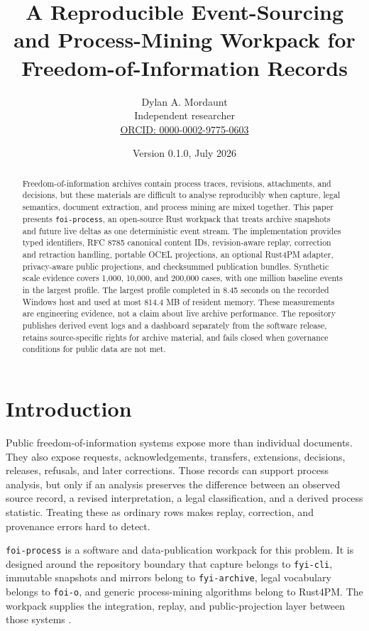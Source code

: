 \documentclass[11pt]{article}
\title{A Reproducible Event-Sourcing and Process-Mining Workpack for Freedom-of-Information Records}
\author{Dylan A. Mordaunt\\\small Independent researcher\\\small \href{https://orcid.org/0000-0002-9775-0603}{ORCID: 0000-0002-9775-0603}}
\date{Version 0.1.0, July 2026}
\begin{document}
\maketitle

\begin{abstract}
Freedom-of-information archives contain process traces, revisions, attachments, and decisions, but
these materials are difficult to analyse reproducibly when capture, legal semantics, document
extraction, and process mining are mixed together. This paper presents \texttt{foi-process}, an
open-source Rust workpack that treats archive snapshots and future live deltas as one deterministic
event stream. The implementation provides typed identifiers, RFC 8785 canonical content IDs,
revision-aware replay, correction and retraction handling, portable OCEL projections, an optional
Rust4PM adapter, privacy-aware public projections, and checksummed publication bundles. Synthetic
scale evidence covers 1,000, 10,000, and 200,000 cases, with one million baseline events in the
largest profile. The largest profile completed in 8.45 seconds on the recorded Windows host and
used at most 814.4 MB of resident memory. These measurements are engineering evidence, not a
claim about live archive performance. The repository publishes derived event logs and a dashboard
separately from the software release, retains source-specific rights for archive material, and
fails closed when governance conditions for public data are not met.
\end{abstract}

\section{Introduction}
Public freedom-of-information systems expose more than individual documents. They also expose
requests, acknowledgements, transfers, extensions, decisions, releases, refusals, and later
corrections. Those records can support process analysis, but only if an analysis preserves the
difference between an observed source record, a revised interpretation, a legal classification,
and a derived process statistic. Treating these as ordinary rows makes replay, correction, and
provenance errors hard to detect.

\texttt{foi-process} is a software and data-publication workpack for this problem. It is designed
around the repository boundary that capture belongs to \texttt{fyi-cli}, immutable snapshots and
mirrors belong to \texttt{fyi-archive}, legal vocabulary belongs to \texttt{foi-o}, and generic
process-mining algorithms belong to Rust4PM. The workpack supplies the integration, replay, and
public-projection layer between those systems \cite{foi-cli,foi-archive,foi-o,rust4pm}.
\end{document}
